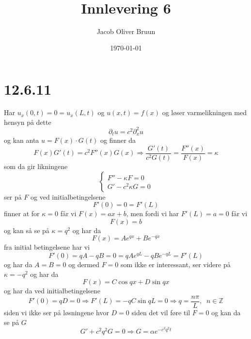 \documentclass{report}
\title{Innlevering 6}
\author{Jacob Oliver Bruun}
\date{\today}
\newcommand{\M}[2]{\mathbb{#1}^{#2}}
\begin{document}
\section*{12.6.11}
Har $u_{x}(0, t) = 0 = u_{x}(L, t)$ og $u(x, t) = f(x)$ og løser varmelikningen med hensyn på dette
\begin{equation}
  \label{eq:1}
  \partial_{t} u = c^{2} \partial_{x}^{2} u
\end{equation}
og kan anta $u = F(x) \cdot G(t)$ og finner da
\begin{equation}
  \label{eq:2}
  F(x) G'(t) = c^{2}F''(x) G(x) \Rightarrow \frac{G'(t)}{c^{2}G(t)} = \frac{F''(x)}{F(x)} = \kappa
\end{equation}
som da gir likningene
\begin{equation}
  \label{eq:3}
  \left\lbrace
  \begin{array}{l}
    F'' - \kappa F = 0 \\
    G' - c^{2} \kappa G = 0
  \end{array}
  \right.
\end{equation}
ser på $F$ og ved initialbetingelsene
\begin{equation}
  \label{eq:5}
  F'(0) = 0 = F'(L)
\end{equation}
finner at for $\kappa = 0$ får vi $F(x) = ax + b$, men fordi vi har $F'(L) = a = 0$ får vi
\begin{equation}
  \label{eq:4}
  F(x) = b
\end{equation}
og kan så se på $\kappa = q^{2}$ og har da
\begin{equation}
  \label{eq:6}
  F(x) = Ae^{qx} + Be^{-qx}
\end{equation}
fra initial betingelsene har vi
\begin{equation}
  \label{eq:7}
  F'(0) = qA - qB = 0 = qAe^{qL} - qBe^{-qL} = F'(L)
\end{equation}
og har da $A=B=0$ og dermed $F = 0$ som ikke er interessant, ser videre på $\kappa = -q^{2}$ og har da
\begin{equation}
  \label{eq:8}
  F(x) = C\cos qx + D\sin qx
\end{equation}
og har da ved initialbetingelsene
\begin{equation}
  \label{eq:9}
  F'(0) = qD = 0 \Rightarrow F'(L) = -qC\sin qL = 0 \Rightarrow q = \frac{n\pi}{L}, \;\; n \in \M{Z}{}
\end{equation}
siden vi ikke ser på løsningene hvor $D = 0$ siden det vil føre til $F = 0$ og kan da se på $G$
\begin{equation}
  \label{eq:10}
  G' + c^{2} q^{2}G = 0 \Rightarrow G = \alpha e^{-c^{2}q^{2}t}
\end{equation}
\end{document}
